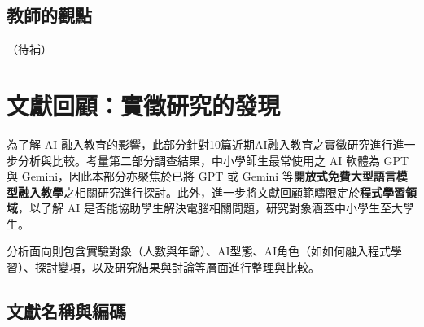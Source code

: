 \subsection{教師的觀點}\label{sec:教師觀點}

（待補）

\section{文獻回顧：實徵研究的發現}\label{sec:文獻回顧}

為了解 AI 融入教育的影響，此部分針對10篇近期AI融入教育之實徵研究進行進一步分析與比較。考量第二部分調查結果，中小學師生最常使用之 AI 軟體為 GPT 與 Gemini，因此本部分亦聚焦於已將 GPT 或 Gemini 等\textbf{開放式免費大型語言模型融入教學}之相關研究進行探討。此外，進一步將文獻回顧範疇限定於\textbf{程式學習領域}，以了解 AI 是否能協助學生解決電腦相關問題，研究對象涵蓋中小學生至大學生。

分析面向則包含實驗對象（人數與年齡）、AI型態、AI角色（如如何融入程式學習）、探討變項，以及研究結果與討論等層面進行整理與比較。

\subsection{文獻名稱與編碼}\label{sec:文獻名稱}

